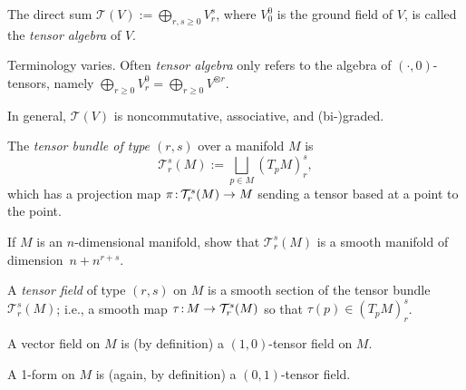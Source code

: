 \begin{definition}\label{def:tensor algebra}
	The direct sum $\displaystyle \mathcal{T}(V):= \bigoplus_{r,s \geq 0} V_r^s$, where $V_0^0$ is the ground field of $V$, is called the \emph{tensor algebra} of $V$.
\end{definition}

\begin{remark}
	Terminology varies. Often \emph{tensor algebra} only refers to the algebra of $(\cdot , 0 )$-tensors, namely $\displaystyle \bigoplus_{r\geq 0} V_r^0 = \bigoplus_{r\geq 0} V^{\otimes r}$.
\end{remark}

In general, $\mathcal{T}(V)$ is noncommutative, associative, and (bi-)graded.

\begin{definition}\label{def:tensor bundle}
	The \emph{tensor bundle of type $(r,s)$} over a manifold $M$ is
	\[
		\mathcal{T}_r^s(M) := \bigsqcup_{p \in M} \left(T_pM\right)_r^s,
	\]
	which has a projection map $\pi\colon\thinspace\!\! \mathcal{T}_r^s(M) \to M$ sending a tensor based at a point to the point. 
	
\begin{exercise}
	If $M$ is an $n$-dimensional manifold, show that $\mathcal{T}_r^s(M)$ is a smooth manifold of dimension~${n + n^{r+s}}$. 
\end{exercise}
	
	A \emph{tensor field} of type $(r,s)$ on $M$ is a smooth section of the tensor bundle $\mathcal{T}_r^s(M)$; i.e., a smooth map $\tau\colon\thinspace\!\! M \to \mathcal{T}_r^s(M)$ so that $\tau(p) \in \left(T_p M\right)_r^s$.
\end{definition}

\begin{example}
	A vector field on $M$ is (by definition) a $(1,0)$-tensor field on $M$.
\end{example}

\begin{example}
	A 1-form on $M$ is (again, by definition) a $(0,1)$-tensor field.
\end{example}

